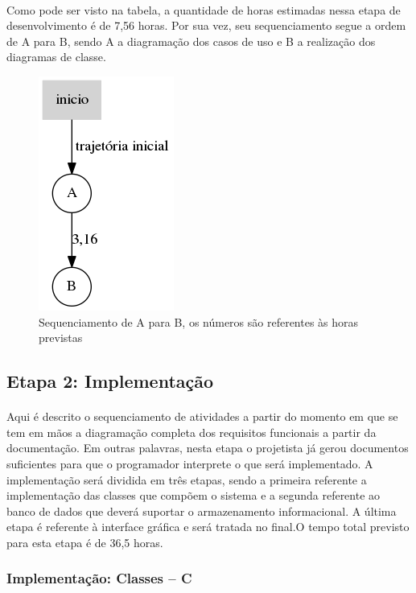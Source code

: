 \documentclass[12pt,a4paper]{article}
\begin{document}
		\paragraph{} Como pode ser visto na tabela, a quantidade de horas estimadas nessa etapa de desenvolvimento é de 7,56 horas. Por sua vez, seu sequenciamento segue a ordem de A para B, sendo A a diagramação dos casos de uso e B a realização dos diagramas de classe. \\
		\begin{figure}[!ht]
		\centering
		\includegraphics[scale=0.5]{001.png}
		\caption{Sequenciamento de A para B, os números são referentes às horas previstas}
		\end{figure}	
		\subsection{Etapa 2: Implementação}	
		\paragraph{} Aqui é descrito o sequenciamento de atividades a partir do momento em que se tem em mãos a diagramação completa dos requisitos funcionais a partir da documentação. Em outras palavras, nesta etapa o projetista já gerou documentos suficientes para que o programador interprete o que será implementado. A implementação será dividida em três etapas, sendo a primeira referente a implementação das classes que compõem o sistema e a segunda referente ao banco de dados que deverá suportar o armazenamento informacional. A última etapa é referente à interface gráfica e será tratada no final.O tempo total previsto para esta etapa é de 36,5 horas.         	
		\subsubsection{Implementação: Classes -- C}
\end{document}
